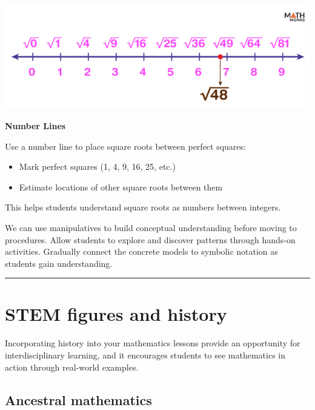 \documentclass[
  letterpaper,
  DIV=11,
  numbers=noendperiod]{scrartcl}
\providecommand{\tightlist}{%
  \setlength{\itemsep}{0pt}\setlength{\parskip}{0pt}}\usepackage{longtable,booktabs,array}
\begin{document}
\includegraphics{../img/mod03/square-root-number-line.jpg}

\textbf{Number Lines}

Use a number line to place square roots between perfect squares:

\begin{itemize}
\tightlist
\item
  Mark perfect squares (1, 4, 9, 16, 25, etc.)
\item
  Estimate locations of other square roots between them
\end{itemize}

This helps students understand square roots as numbers between integers.

We can use manipulatives to build conceptual understanding before moving
to procedures. Allow students to explore and discover patterns through
hands-on activities. Gradually connect the concrete models to symbolic
notation as students gain understanding.

\begin{center}\rule{0.5\linewidth}{0.5pt}\end{center}

\section{STEM figures and history}\label{stem-figures-and-history}

Incorporating history into your mathematics lessons provide an
opportunity for interdisciplinary learning, and it encourages students
to see mathematics in action through real-world examples.

\subsection{Ancestral mathematics}\label{ancestral-mathematics}
\end{document}
